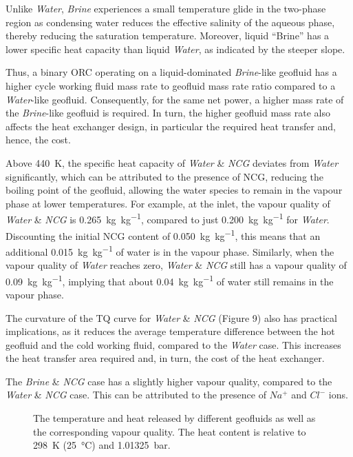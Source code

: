     Unlike \emph{Water}, \emph{Brine} experiences a small temperature glide in the two-phase region as condensing water reduces the effective salinity of the aqueous phase, thereby reducing the saturation temperature. Moreover, liquid “Brine” has a lower specific heat capacity than liquid \emph{Water}, as indicated by the steeper slope. 
    
    Thus, a binary ORC operating on a liquid-dominated \emph{Brine}-like geofluid has a higher cycle working fluid mass rate to geofluid mass rate ratio compared to a \emph{Water}-like geofluid. Consequently, for the same net power, a higher mass rate of the \emph{Brine}-like geofluid is required. In turn, the higher geofluid mass rate also affects the heat exchanger design, in particular the required heat transfer and, hence, the cost.
    
    Above \qty{440}{\K}, the specific heat capacity of \emph{Water} \& \emph{\ac{NCG}} deviates from \emph{Water} significantly, which can be attributed to the presence of \ac{NCG}, reducing the boiling point of the geofluid, allowing the water species to remain in the vapour phase at lower temperatures. For example, at the inlet, the vapour quality of \emph{Water} \& \emph{\ac{NCG}} is \qty{0.265}{\kg\per\kg}, compared to just \qty{0.200}{\kg\per\kg} for \emph{Water}. Discounting the initial \ac{NCG} content of \qty{0.050}{\kg\per\kg}, this means that an additional \qty{0.015}{\kg\per\kg} of water is in the vapour phase. Similarly, when the vapour quality of \emph{Water} reaches zero, \emph{Water} \& \emph{\ac{NCG}} still has a vapour quality of \qty{0.09}{\kg\per\kg}, implying that about \qty{0.04}{\kg\per\kg} of water still remains in the vapour phase.
    
    The curvature of the TQ curve for \emph{Water} \& \emph{\ac{NCG}} (Figure 9) also has practical implications, as it reduces the average temperature difference between the hot geofluid and the cold working fluid, compared to the \emph{Water} case. This increases the heat transfer area required and, in turn, the cost of the heat exchanger.
    
    The \emph{Brine} \& \emph{\ac{NCG}} case has a slightly higher vapour quality, compared to the \emph{Water} \& \emph{\ac{NCG}} case. This can be attributed to the presence of \(Na^+\) and \(Cl^-\) ions.

    \begin{figure}[H]
        \centering
                
        \caption[The temperature and heat released by different geofluids as well as the corresponding vapour quality.]{The temperature and heat released by different geofluids as well as the corresponding vapour quality. The heat content is relative to \qty{298}{\K} (\qty{25}{\degreeCelsius}) and \qty{1.01325}{\bar}.}
        \label{fig:geoprop_casestudy}
    \end{figure}

